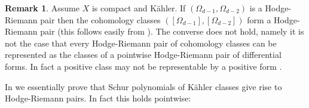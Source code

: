 \documentclass[a4,reqno]{amsart}
\theoremstyle{definition}
\newtheorem{remark}[theorem]{Remark}
\numberwithin{equation}{section}
\begin{document}
\begin{remark}\label{rem:diffformpairisacohomologypair}
Assume $X$ is compact and K\"ahler.  If $(\Omega_{d-1},\Omega_{d-2})$ is a Hodge-Riemann pair then the cohomology classes $([\Omega_{d-1}],[\Omega_{d-2}])$ form a Hodge-Riemann pair (this follows easily from \cite[Corollary 5.4]{RossToma3}).    The converse does not hold, namely it is not the case that every Hodge-Riemann pair of cohomology classes can be represented as the classes of a pointwise Hodge-Riemann pair of differential forms.  In fact a positive class may not be representable by a positive form \cite{DELV11}.
\end{remark}



In \cite{RossToma3} we essentially prove that Schur polynomials of K\"ahler classes give rise to Hodge-Riemann pairs.  In fact this holds pointwise:
\end{document}
